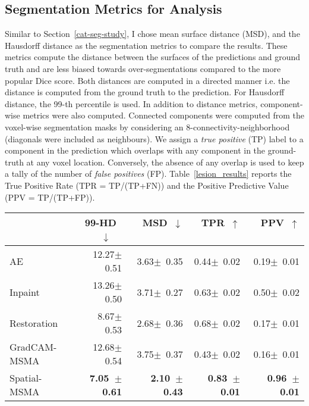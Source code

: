 \subsection*{Segmentation Metrics for Analysis}
Similar to Section~\ref{cat-seg-study}, I chose mean surface distance (MSD), and the Hausdorff distance as the segmentation metrics to compare the results. These metrics compute the distance between the surfaces of the predictions and ground truth and are less biased towards over-segmentations compared to the more popular Dice score. Both distances are computed in a directed manner i.e. the distance is computed from the ground truth to the prediction. For Hausdorff distance, the 99-th percentile is used. In addition to distance metrics, component-wise metrics were also computed. Connected components were computed from the voxel-wise segmentation masks by considering an 8-connectivity-neighborhood (diagonals were included as neighbours). We assign a \textit{true positive} (TP) label to a component in the prediction which overlaps with any component in the ground-truth at any voxel location. Conversely, the absence of any overlap is used to keep a tally of the number of \textit{false positives} (FP). Table~\ref{lesion_results} reports the True Positive Rate (TPR = TP/(TP+FN)) and the Positive Predictive Value (PPV = TP/(TP+FP)). 


\begin{table*}[!ht]
\centering
\begin{tabular}{lrr|rr}
{} &        99-HD~$\downarrow$~~&      MSD~$\downarrow$~~~~~&        TPR~$\uparrow$~~~~&             PPV~$\uparrow$~~~~~\\
\midrule
AE           &  12.27$\pm$~0.51 &  3.63$\pm$~0.35 &  0.44$\pm$~0.02 &  0.19$\pm$~0.01 \\
Inpaint      &  13.26$\pm$~0.50 &  3.71$\pm$~0.27 &  0.63$\pm$~0.02 &  0.50$\pm$~0.02 \\
Restoration  &   8.67$\pm$~0.53 &  2.68$\pm$~0.36 &  0.68$\pm$~0.02 &  0.17$\pm$~0.01 \\
GradCAM-MSMA &  12.68$\pm$~0.54 &  3.75$\pm$~0.37 &  0.43$\pm$~0.02 &  0.16$\pm$~0.01 \\
Spatial-MSMA &  \textbf{7.05~$\pm$~0.61} &  \textbf{2.10~$\pm$~0.43} &  \textbf{0.83~$\pm$~0.01} &  \textbf{0.96~$\pm$~0.01} \\
\end{tabular}

\caption{Segmentation metrics for lesion detection. Each model was trained only on the (same) inlier samples. Right column shows distance based metrics: 99th-percentile of the Hausdorff Distance (99-HD) and Mean Surface Distance (MSD). Right column shows component-wise metrics: True Positive Rate (TPR = TP/(TP+FN)) and Positive Predictive Value (PPV = TP/(TP+FP)). Spatial-MSMA significantly outperforms the baseline methodologies, especially for component-wise metrics. }
\label{lesion_results}
\end{table*}

